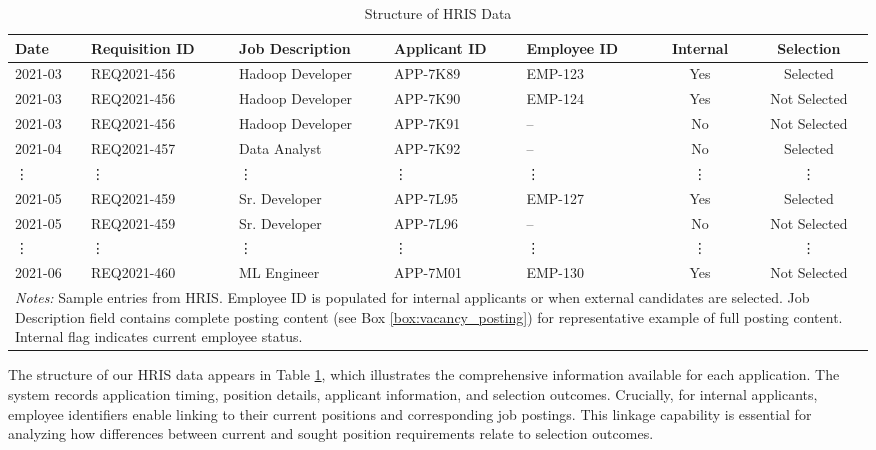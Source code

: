 \begin{table}[t]
    \caption{Structure of HRIS Data}
    \begin{tabular*}{\textwidth}{@{\extracolsep\fill}lllllcc}
    \toprule
    Date & Requisition ID & Job Description & Applicant ID & Employee ID & Internal & Selection \\
    \midrule
    2021-03 & REQ2021-456 & Hadoop Developer & APP-7K89 & EMP-123 & Yes & Selected \\
    2021-03 & REQ2021-456 & Hadoop Developer & APP-7K90 & EMP-124 & Yes & Not Selected \\
    2021-03 & REQ2021-456 & Hadoop Developer & APP-7K91 & -- & No & Not Selected \\
    2021-04 & REQ2021-457 & Data Analyst & APP-7K92 & -- & No & Selected \\
    \vdots & \vdots & \vdots & \vdots & \vdots & \vdots & \vdots \\
    2021-05 & REQ2021-459 & Sr. Developer & APP-7L95 & EMP-127 & Yes & Selected \\
    2021-05 & REQ2021-459 & Sr. Developer & APP-7L96 & -- & No & Not Selected \\
    \vdots & \vdots & \vdots & \vdots & \vdots & \vdots & \vdots \\
    2021-06 & REQ2021-460 & ML Engineer & APP-7M01 & EMP-130 & Yes & Not Selected \\
    \bottomrule
    \multicolumn{7}{p{\textwidth}}{\footnotesize \textit{Notes:} Sample entries from HRIS. Employee ID is populated for internal applicants or when external candidates are selected. Job Description field contains complete posting content (see Box \ref{box:vacancy_posting}) for representative example of full posting content. Internal flag indicates current employee status.} \\
    \end{tabular*}
    \label{tab:hris_structure}
\end{table}

The structure of our HRIS data appears in Table \ref{tab:hris_structure}, which illustrates the comprehensive information available for each application. The system records application timing, position details, applicant information, and selection outcomes. Crucially, for internal applicants, employee identifiers enable linking to their current positions and corresponding job postings. This linkage capability is essential for analyzing how differences between current and sought position requirements relate to selection outcomes.

